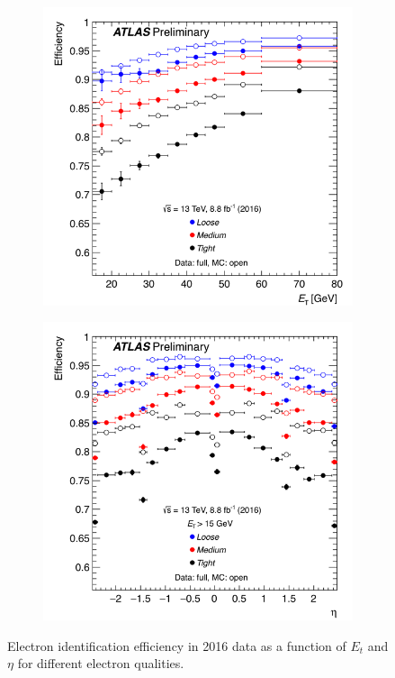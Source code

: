 \begin{figure}[!h] 
\begin{center}
    \begin{subfigure}[b]{0.40\textwidth}    
\includegraphics[width=\textwidth]{figures/EMCalib/Elec_Et.png}
                \caption{ }
    \end{subfigure}
    \begin{subfigure}[b]{0.40\textwidth}    
\includegraphics[width=\textwidth]{figures/EMCalib/Elec_eta.png}
                \caption{ }
    \end{subfigure}
\caption[Electron identification efficiency in 2016 data as a function of $E_t$ and $\eta$ for different electron qualities]{Electron identification efficiency in 2016 data as a function of $E_t$ and $\eta$ for different electron qualities.\cite{EleID} }
\label{fig:elec_eff}
\end{center}
\end{figure}


